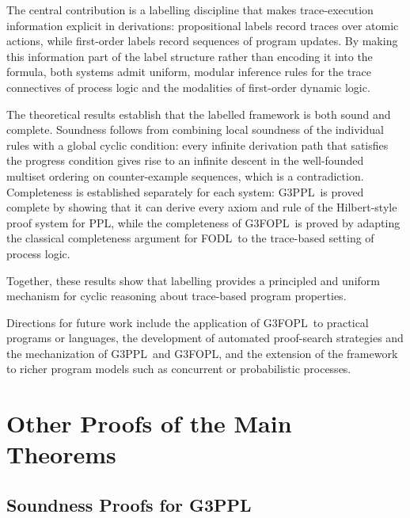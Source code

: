 \documentclass[manuscript,screen]{acmart}
\newcommand{\GiiiPPLcyc}[0]{\mbox{G3PPL}}
\newcommand{\GiiiFOPLcyc}[0]{\mbox{G3FOPL}}
\newcommand{\PPL}[0]{\mbox{PPL}}
\newcommand{\FODL}[0]{\mbox{FODL}}
\begin{document}
\ifx
The central contribution is a labelling discipline that makes trace-execution information explicit in derivations: propositional labels record traces over atomic actions, while first-order labels record sequences of program updates. By making this information part of the label structure rather than encoding it into the formula, both systems admit uniform, modular inference rules for the trace connectives of process logic and the modalities of first-order dynamic logic. 


The theoretical results establish that the labelled framework is both sound and complete. Soundness follows from combining local soundness of the individual rules with a global cyclic condition: every infinite derivation path that satisfies the progress condition gives rise to an infinite descent in the well-founded multiset ordering on counter-example sequences, which is a contradiction. Completeness is established separately for each system: \GiiiPPLcyc\ is proved complete by showing that it can derive every axiom and rule of the Hilbert-style proof system for \PPL, while the completeness of \GiiiFOPLcyc\ is proved by adapting the classical completeness argument for \FODL\ to the trace-based setting of process logic. 

Together, these results show that labelling provides a principled and uniform mechanism for cyclic reasoning about trace-based program properties.  

 Directions for future work include the application of \GiiiFOPLcyc\ to practical programs or languages, the development of automated proof-search strategies and the mechanization of \GiiiPPLcyc\ and \GiiiFOPLcyc, and the extension of the framework to richer program models such as concurrent or probabilistic processes. 
\fi




\clearpage
\appendix

\section{Other Proofs of the Main Theorems}

\subsection{Soundness Proofs for \GiiiPPLcyc}
\label{section:About the Soundness of GiiiPPLcyc}
\end{document}
